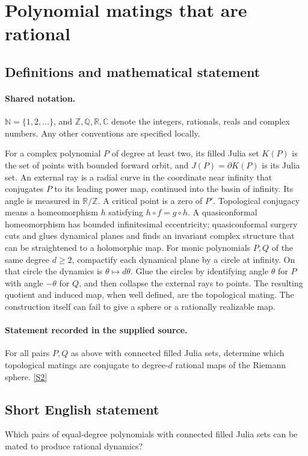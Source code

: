 \documentclass[11pt]{article}
\newcommand{\sref}[2]{\hyperlink{source:#1:#2}{[S#2]}}
\begin{document}
\section{Polynomial matings that are rational}\label{statement}

\subsection{Definitions and mathematical statement}

\paragraph{Shared notation.}$\mathbb N=\{1,2,\ldots\}$, and $\mathbb Z,\mathbb Q,\mathbb R,\mathbb C$ denote the integers, rationals, reals and complex numbers. Any other conventions are specified locally.


For a complex polynomial $P$ of degree at least two, its filled Julia set $K(P)$ is the set of points with bounded forward orbit, and $J(P)=\partial K(P)$ is its Julia set. An external ray is a radial curve in the coordinate near infinity that conjugates $P$ to its leading power map, continued into the basin of infinity. Its angle is measured in $\mathbb R/\mathbb Z$. A critical point is a zero of $P'$. Topological conjugacy means a homeomorphism $h$ satisfying $h\circ f=g\circ h$. A quasiconformal homeomorphism has bounded infinitesimal eccentricity; quasiconformal surgery cuts and glues dynamical planes and finds an invariant complex structure that can be straightened to a holomorphic map.
For monic polynomials $P,Q$ of the same degree $d\geq2$, compactify each dynamical plane by a circle at infinity. On that circle the dynamics is $\theta\mapsto d\theta$. Glue the circles by identifying angle $\theta$ for $P$ with angle $-\theta$ for $Q$, and then collapse the external rays to points. The resulting quotient and induced map, when well defined, are the topological mating. The construction itself can fail to give a sphere or a rationally realizable map.
\paragraph{Statement recorded in the supplied source.}
For all pairs $P,Q$ as above with connected filled Julia sets, determine which topological matings are conjugate to degree-$d$ rational maps of the Riemann sphere. \sref{statement}{2}
\subsection{Short English statement}
Which pairs of equal-degree polynomials with connected filled Julia sets can be mated to produce rational dynamics?
\end{document}
